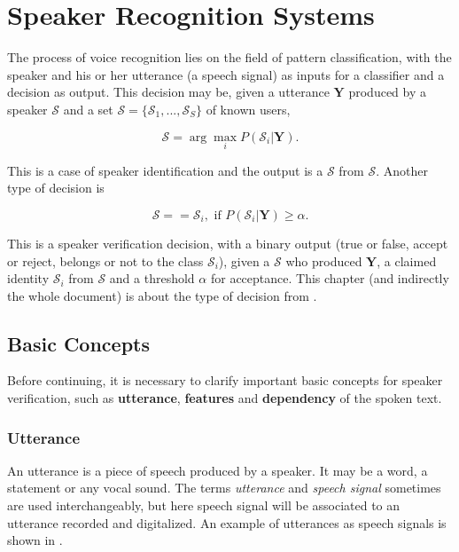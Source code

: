 \chapter{Speaker Recognition Systems}

The process of voice recognition lies on the field of pattern classification, with the speaker and his or her utterance (a speech signal) as inputs for a classifier and a decision as output. This decision may be, given a utterance $\boldsymbol{Y}$ produced by a speaker $\mathcal{S}$ and a set $\boldsymbol{\mathcal{S}} = \{\mathcal{S}_1, ..., \mathcal{S}_S\}$ of known users,

\begin{equation}
    \mathcal{S} = \arg\max_i P(\mathcal{S}_i|\boldsymbol{Y}).
    \label{eq:decision_speaker_identification}
\end{equation}

\noindent This is a case of speaker identification and the output is a $\mathcal{S}$ from $\boldsymbol{\mathcal{S}}$. Another type of decision is

\begin{equation}
    \mathcal{S} == \mathcal{S}_i, \text{ if } P(\mathcal{S}_i|\boldsymbol{Y}) \geq \alpha.
    \label{eq:decision_speaker_verification}
\end{equation}

\noindent This is a speaker verification decision, with a binary output (true or false, accept or reject, belongs or not to the class $\mathcal{S}_i$), given a $\mathcal{S}$ who produced $\boldsymbol{Y}$, a claimed identity $\mathcal{S}_i$ from $\boldsymbol{\mathcal{S}}$ and a threshold $\alpha$ for acceptance. This chapter (and indirectly the whole document) is about the type of decision from .

\section{Basic Concepts}

Before continuing, it is necessary to clarify important basic concepts for speaker verification, such as \textbf{utterance}, \textbf{features} and \textbf{dependency} of the spoken text.

\subsection{Utterance}

An utterance is a piece of speech produced by a speaker. It may be a word, a statement or any vocal sound. The terms \emph{utterance} and \emph{speech signal} sometimes are used interchangeably, but here speech signal will be associated to an utterance recorded and digitalized. An example of utterances as speech signals is shown in .

